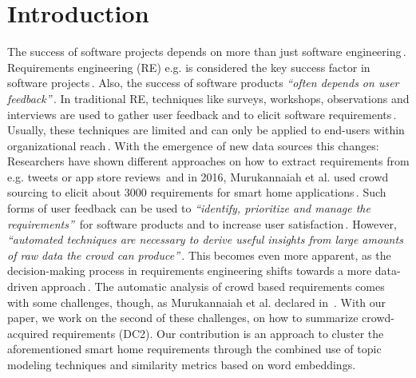 \section{Introduction} %
\label{sec:introduction}
The success of software projects depends on more than just software engineering\,\cite{mohagheghi_what_2017}. Requirements engineering (RE) e.g. is considered the key success factor in software projects\,\cite{mavin_towards_2019}. Also, the success of software products \textit{``often  depends  on  user  feedback''}\,\cite{maalej_toward_2016}. In traditional RE, techniques like surveys, workshops, observations and interviews are used to gather user feedback and to elicit software requirements\,\cite{pohl_requirements_2015}. Usually, these techniques are limited and can only be applied to end-users within organizational reach\,\cite{oriol_fame_2018}. With the emergence of new data sources this changes: Researchers have shown different approaches on how to extract requirements from e.g. tweets or app store reviews\,\cite{oriol_fame_2018,stanik_classifying_2019} and in 2016, Murukannaiah et al. used crowd sourcing to elicit about 3000 requirements for smart home applications\,\cite{murukannaiah_acquiring_2016}. Such forms of user feedback can be used to \textit{``identify, prioritize and manage the requirements''}\,\cite{maalej_toward_2016} for software products and to increase user satisfaction\,\cite{palomba_user_2015}. However, \textit{``automated techniques are necessary to derive useful insights from large amounts of raw data the crowd can produce''}\,\cite{murukannaiah_toward_2017}. This becomes even more apparent, as the decision-making process in requirements engineering shifts towards a more data-driven approach\,\cite{maalej_data-driven_2019}. The automatic analysis of crowd based requirements comes with some challenges, though, as Murukannaiah et al. declared in \,\cite{murukannaiah_toward_2017}. With our paper, we work on the second of these challenges, on how to summarize crowd-acquired requirements (DC2). Our contribution is an approach to cluster the aforementioned smart home requirements through the combined use of topic modeling techniques and similarity metrics based on word embeddings.
